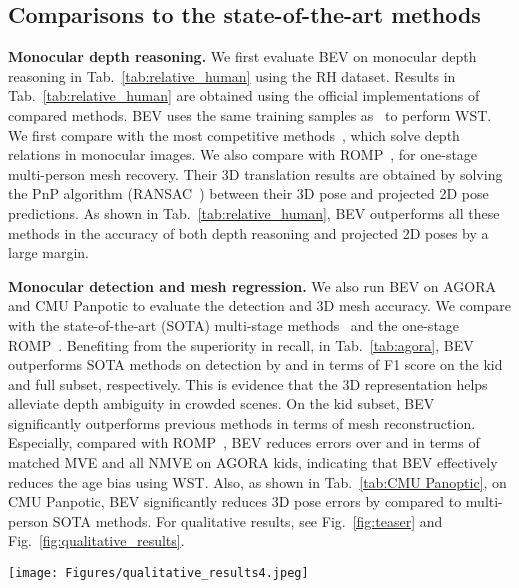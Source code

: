 \documentclass[10pt,twocolumn,letterpaper]{article}
\begin{document}
\subsection{Comparisons to the state-of-the-art methods}

\textbf{Monocular depth reasoning.}
We first evaluate BEV on monocular depth reasoning in Tab.~\ref{tab:relative_human} using the RH dataset.
Results in Tab.~\ref{tab:relative_human} are obtained using the official implementations of compared methods. 
BEV uses the same training samples as~\cite{romp} to perform WST.
We first compare with the most competitive methods~\cite{moon2019camera,jiang2020coherent,zhen2020smap}, which solve depth relations in monocular images.
We also compare with ROMP~\cite{romp}, for one-stage multi-person mesh recovery.
Their 3D translation results are obtained by solving the PnP algorithm (RANSAC~\cite{fischler1981random}) between their 3D pose and projected 2D pose predictions.
As shown in Tab.~\ref{tab:relative_human}, BEV outperforms all these methods in the accuracy of both depth reasoning and projected 2D poses by a large margin.


\textbf{Monocular detection and mesh regression.}
We also run BEV on AGORA and CMU Panpotic to evaluate the detection and 3D mesh accuracy.
We compare with the state-of-the-art (SOTA) multi-stage methods~\cite{zanfir2018deep,zanfir2018monocular,jiang2020coherent,kocabas2021pare,Kocabas_SPEC_2021,patel2021agora,choi20223dcrowdnet} and the one-stage ROMP~\cite{romp}.
Benefiting from the superiority in recall, in Tab.~\ref{tab:agora}, BEV outperforms SOTA methods on detection by  and  in terms of F1 score on the kid and full subset, respectively.
This is evidence that the 3D representation helps alleviate depth ambiguity in crowded scenes.
On the kid subset, BEV significantly outperforms previous methods in terms of mesh reconstruction.
Especially, compared with ROMP~\cite{romp}, BEV reduces errors over  and  in terms of matched MVE and all NMVE on AGORA kids, indicating that BEV effectively reduces the age bias using WST.
Also, as shown in Tab.~\ref{tab:CMU Panoptic}, on CMU Panpotic, BEV significantly reduces 3D pose errors by  compared to multi-person SOTA methods.
For qualitative results, see Fig.~\ref{fig:teaser} and
Fig.~\ref{fig:qualitative_results}.

\begin{figure*}[t]
	\centerline{	\texttt{[image: Figures/qualitative\_results4.jpeg]}}
	\vspace{-0.1in}
	\caption{Qualitative results on AGORA, RH, and Internet images~\cite{pexels}. Note how children and adults are properly placed in depth.}\vspace{-1mm}
	\label{fig:qualitative_results}
\end{figure*}
\end{document}
